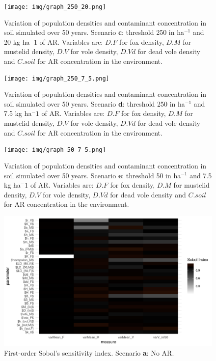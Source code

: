 \documentclass[11pt]{article}
\begin{document}
\begin{figure}[!htb]
	\begin{center}
		\texttt{[image: img/graph\_250\_20.png]}
		\caption{Variation of population densities and contaminant concentration in soil simulated over 50 years. Scenario \textbf{c}: threshold 250 in ha$^{-1}$ and 20 kg ha$^-1$ of AR. Variables are: $D.F$ for fox density, $D.M$ for mustelid density, $D.V$ for vole density, $D.Vd$ for dead vole density and $C.soil$ for AR concentration in the environment.}
	\end{center}
\end{figure}

\begin{figure}[!htb]
	\begin{center}
		\texttt{[image: img/graph\_250\_7\_5.png]}
		\caption{Variation of population densities and contaminant concentration in soil simulated over 50 years. Scenario \textbf{d}: threshold 250 in ha$^{-1}$ and 7.5 kg ha$^-1$ of AR. Variables are: $D.F$ for fox density, $D.M$ for mustelid density, $D.V$ for vole density, $D.Vd$ for dead vole density and $C.soil$ for AR concentration in the environment.}
	\end{center}
\end{figure}

\begin{figure}[!htb]
	\begin{center}
		\texttt{[image: img/graph\_50\_7\_5.png]}
		\caption{Variation of population densities and contaminant concentration in soil simulated over 50 years. Scenario \textbf{e}: threshold 50 in ha$^{-1}$ and 7.5 kg ha$^-1$ of AR. Variables are: $D.F$ for fox density, $D.M$ for mustelid density, $D.V$ for vole density, $D.Vd$ for dead vole density and $C.soil$ for AR concentration in the environment.}
	\end{center}
\end{figure}

\begin{figure}[!htb]
	\begin{center}
		\includegraphics[width=\linewidth]{img/plt_sobolIndex_0_0.png}
		\caption{First-order Sobol's sensitivity index. Scenario \textbf{a}: No AR.}
	\end{center}
\end{figure}
\end{document}
